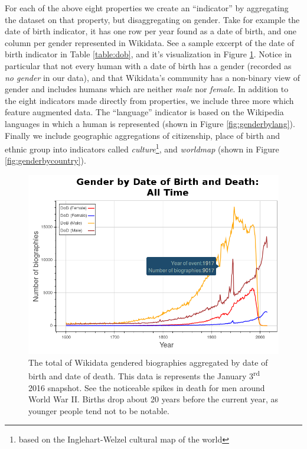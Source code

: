 \documentclass{sig-alternate-05-2015}
\begin{document}
For each of the above eight properties we create an ``indicator'' by aggregating the dataset on that property, but disaggregating on gender. Take for example the date of birth indicator, it has one row per year found as a date of birth, and one column per gender represented in Wikidata. See a sample excerpt of the date of birth indicator in Table \ref{table:dob}, and it's visualization in Figure \ref{fig:genderbydob}. Notice in particular that not every human with a date of birth has a gender (recorded as \textit{no gender} in our data), and that Wikidata's community has a non-binary view of gender and includes humans which are neither \textit{male} nor \textit{female}. In addition to the eight indicators made directly from properties, we include three more which feature augmented data. The ``language'' indicator is based on the Wikipedia languages in which a human is represented (shown in Figure \ref{fig:genderbylang}). Finally we include geographic aggregations of citizenship, place of birth and ethnic group into indicators called \textit{culture}\footnote{based on the Inglehart-Welzel cultural map of the world}, and \textit{worldmap} (shown in Figure \ref{fig:genderbycountry}).


\begin{figure}
\includegraphics[width=\columnwidth]{figures/genderbydob.png} 
\caption{The total of Wikidata gendered biographies aggregated by date of birth and date of death. This data is represents the January 3\textsuperscript{rd} 2016 snapshot. See the noticeable spikes in death for men around World War II. Births drop about 20 years before the current year, as younger people tend not to be notable.}
\label{fig:genderbydob}
\end{figure}
\end{document}
